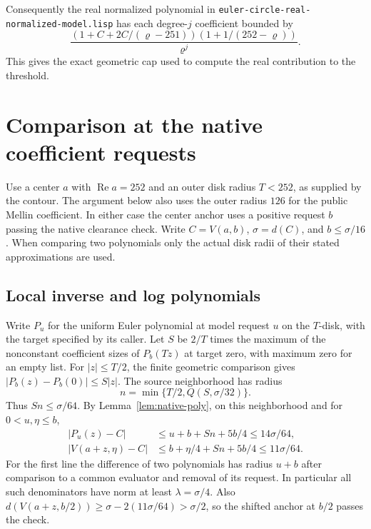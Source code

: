 \documentclass[11pt]{amsart}
\theoremstyle{definition}
\theoremstyle{remark}
\numberwithin{equation}{section}
\newcommand{\re}{\operatorname{Re}}
\newcommand{\code}[1]{\nolinkurl{#1}}
\begin{document}
Consequently the real normalized polynomial in
\code{euler-circle-real-normalized-model.lisp}
has each degree-$j$ coefficient bounded by
\[
 \frac{(1+C+2C/(\varrho-251))(1+1/(252-\varrho))}
      {\varrho^j}.
\]
This gives the exact geometric cap used to compute the
real contribution to the threshold.

\section{Comparison at the native coefficient requests}
\label{sec:native-normalization}

Use a center $a$ with $\re a=252$ and an outer disk radius
$T<252$, as supplied by the contour. The argument below
also uses the outer radius $126$ for the public Mellin
coefficient. In either case the center anchor uses a
positive request $b$ passing the native clearance check.
Write $C=V(a,b)$, $\sigma=d(C)$, and $b\le\sigma/16$.
When comparing two polynomials only the actual disk radii
of their stated approximations are used.

\subsection{Local inverse and log polynomials}

Write $P_u$ for the uniform Euler polynomial at model
request $u$ on the $T$-disk, with the target specified by
its caller. Let $S$ be $2/T$ times the maximum of the
nonconstant coefficient sizes of $P_b(Tz)$ at target
zero, with maximum zero for an empty list.
For $|z|\le T/2$, the finite geometric comparison gives
$|P_b(z)-P_b(0)|\le S|z|$.
The source neighborhood has radius
\[
       n=\min\{T/2,Q(S,\sigma/32)\}.
\]
Thus $Sn\le\sigma/64$. By Lemma~\ref{lem:native-poly},
on this neighborhood and for $0<u,\eta\le b$,
\begin{align*}
 |P_u(z)-C| &\le u+b+Sn+5b/4 \le 14\sigma/64,\\
 |V(a+z,\eta)-C| &\le b+\eta/4+Sn+5b/4
                              \le 11\sigma/64 .
\end{align*}
For the first line the difference of two polynomials
has radius $u+b$ after comparison to a common evaluator
and removal of its request. In particular all such
denominators have norm at least $\lambda=\sigma/4$.
Also $d(V(a+z,b/2))\ge\sigma-2(11\sigma/64)>\sigma/2$,
so the shifted anchor at $b/2$ passes the check.
\end{document}
